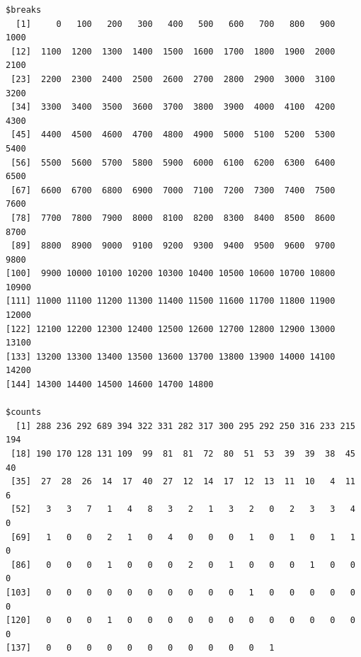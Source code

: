 \documentclass[]{article}
\begin{document}
\begin{verbatim}
$breaks
  [1]     0   100   200   300   400   500   600   700   800   900  1000
 [12]  1100  1200  1300  1400  1500  1600  1700  1800  1900  2000  2100
 [23]  2200  2300  2400  2500  2600  2700  2800  2900  3000  3100  3200
 [34]  3300  3400  3500  3600  3700  3800  3900  4000  4100  4200  4300
 [45]  4400  4500  4600  4700  4800  4900  5000  5100  5200  5300  5400
 [56]  5500  5600  5700  5800  5900  6000  6100  6200  6300  6400  6500
 [67]  6600  6700  6800  6900  7000  7100  7200  7300  7400  7500  7600
 [78]  7700  7800  7900  8000  8100  8200  8300  8400  8500  8600  8700
 [89]  8800  8900  9000  9100  9200  9300  9400  9500  9600  9700  9800
[100]  9900 10000 10100 10200 10300 10400 10500 10600 10700 10800 10900
[111] 11000 11100 11200 11300 11400 11500 11600 11700 11800 11900 12000
[122] 12100 12200 12300 12400 12500 12600 12700 12800 12900 13000 13100
[133] 13200 13300 13400 13500 13600 13700 13800 13900 14000 14100 14200
[144] 14300 14400 14500 14600 14700 14800

$counts
  [1] 288 236 292 689 394 322 331 282 317 300 295 292 250 316 233 215 194
 [18] 190 170 128 131 109  99  81  81  72  80  51  53  39  39  38  45  40
 [35]  27  28  26  14  17  40  27  12  14  17  12  13  11  10   4  11   6
 [52]   3   3   7   1   4   8   3   2   1   3   2   0   2   3   3   4   0
 [69]   1   0   0   2   1   0   4   0   0   0   1   0   1   0   1   1   0
 [86]   0   0   0   1   0   0   0   2   0   1   0   0   0   1   0   0   0
[103]   0   0   0   0   0   0   0   0   0   0   1   0   0   0   0   0   0
[120]   0   0   0   1   0   0   0   0   0   0   0   0   0   0   0   0   0
[137]   0   0   0   0   0   0   0   0   0   0   0   1


\end{verbatim}
\end{document}
